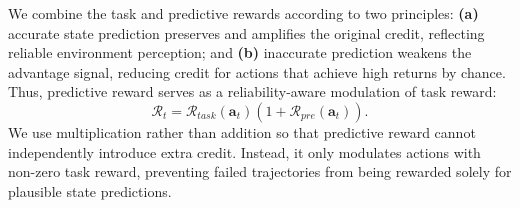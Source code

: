 \documentclass[11pt]{article}
\begin{document}
We combine the task and predictive rewards according to two principles:
\textbf{(a)} accurate state prediction preserves and amplifies the original credit, reflecting reliable environment perception; and
\textbf{(b)} inaccurate prediction weakens the advantage signal, reducing credit for actions that achieve high returns by chance. Thus, predictive reward serves as a reliability-aware modulation of task reward:
\begin{equation}
    \mathcal{R}_t=\mathcal{R}_{task}(\bm{a}_t)(1+\mathcal{R}_{pre}(\bm{a}_t)).
\end{equation}
We use multiplication rather than addition so that predictive reward cannot independently introduce extra credit. Instead, it only modulates actions with non-zero task reward, preventing failed trajectories from being rewarded solely for plausible state predictions.
\end{document}
